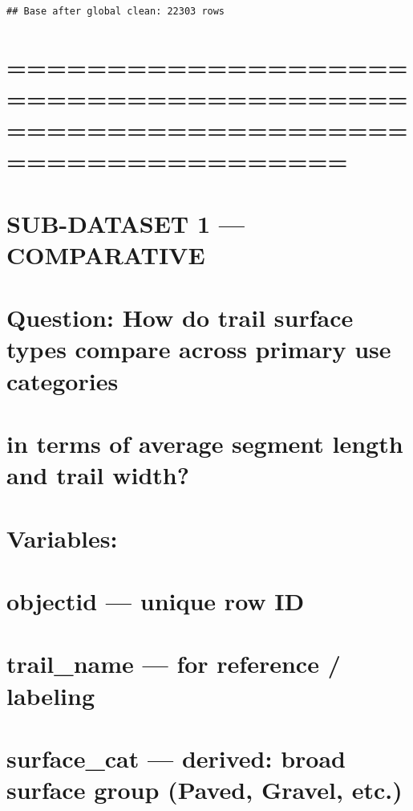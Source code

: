 \documentclass[
]{article}
\begin{document}
\begin{verbatim}
## Base after global clean: 22303 rows
\end{verbatim}

\section{=============================================================================}\label{section-9}

\section{SUB-DATASET 1 --- COMPARATIVE}\label{sub-dataset-1-comparative}

\section{Question: How do trail surface types compare across primary use
categories}\label{question-how-do-trail-surface-types-compare-across-primary-use-categories}

\section{in terms of average segment length and trail
width?}\label{in-terms-of-average-segment-length-and-trail-width}

\section{}\label{section-10}

\section{Variables:}\label{variables}

\section{objectid --- unique row ID}\label{objectid-unique-row-id}

\section{trail\_name --- for reference /
labeling}\label{trail_name-for-reference-labeling}

\section{surface\_cat --- derived: broad surface group (Paved, Gravel,
etc.)}\label{surface_cat-derived-broad-surface-group-paved-gravel-etc.}
\end{document}
